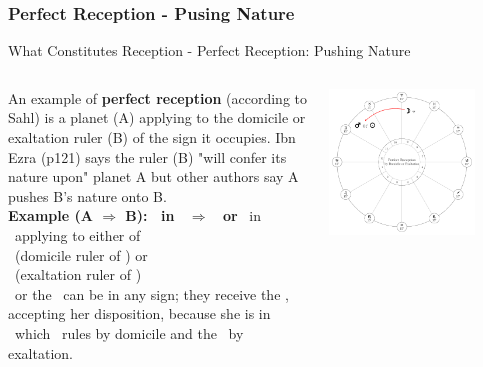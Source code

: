 \subsubsection{Perfect Reception - Pusing Nature}
\begin{frame}[t]{What Constitutes Reception - Perfect Reception: Pushing Nature}
\vspace{0.1cm}
\begin{columns}[T, onlytextwidth]
An example of \textbf{perfect reception} (according to Sahl) is a planet (A) applying to the domicile or exaltation ruler (B) of the sign it occupies. Ibn Ezra (p121) says the ruler (B) "will confer its nature upon" planet A but other authors say A pushes B's nature onto B.  \\
\vspace{0.2cm}
\textbf{Example (A $\Rightarrow$ B): \Moon\ in \Aries\ $\Rightarrow$ \Mars\ or \Sun} 
\ul
\vspace{0.2cm}
\Moon\ in \Aries\ applying to either of \\
\Mars\ (domicile ruler of \Aries) or \\
\Sun\ (exaltation ruler of \Aries) \\
\vspace{0.2cm}
\Mars\ or the \Sun\ can be in any sign; they receive the \Moon, accepting her disposition, because she is in \Aries\ which \Mars\ rules by domicile and the \Sun\ by exaltation.\\


\begin{center}
{\includegraphics[width=0.8\textwidth]{charts/01-perfect-reception}} \\
\end{center}

\end{columns}
\vspace{0.2cm}
\end{frame}
